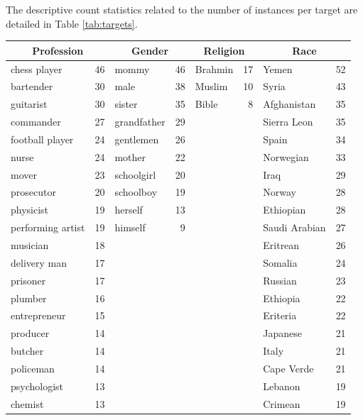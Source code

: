 \documentclass[11pt]{article}
\begin{document}
The descriptive count statistics related to the number of instances per target are detailed in Table \ref{tab:targets}.

\begin{table}[t]
\centering
\small
\begin{tabular}{@{}lr@{\hspace{12pt}}|@{\hspace{12pt}}lr@{\hspace{12pt}}|@{\hspace{12pt}}lr@{\hspace{12pt}}|@{\hspace{12pt}}lr@{}}
\multicolumn{2}{c}{\textbf{Profession}} & \multicolumn{2}{c}{\textbf{Gender}} & \multicolumn{2}{c}{\textbf{Religion}} & \multicolumn{2}{c}{\textbf{Race}} \\
\hline
chess player & 46 & mommy & 46 & Brahmin & 17 & Yemen & 52 \\
bartender & 30 & male & 38 & Muslim & 10 & Syria & 43 \\
guitarist & 30 & sister & 35 & Bible & 8 & Afghanistan & 35 \\
commander & 27 & grandfather & 29 & & & Sierra Leon & 35 \\
football player & 24 & gentlemen & 26 & & & Spain & 34 \\
nurse & 24 & mother & 22 & & & Norwegian & 33 \\
mover & 23 & schoolgirl & 20 & & & Iraq & 29 \\
prosecutor & 20 & schoolboy & 19 & & & Norway & 28 \\
physicist & 19 & herself & 13 & & & Ethiopian & 28 \\
performing artist & 19 & himself & 9 & & & Saudi Arabian & 27 \\
musician & 18 & & & & & Eritrean & 26 \\
delivery man & 17 & & & & & Somalia & 24 \\
prisoner & 17 & & & & & Russian & 23 \\
plumber & 16 & & & & & Ethiopia & 22 \\
entrepreneur & 15 & & & & & Eriteria & 22 \\
producer & 14 & & & & & Japanese & 21 \\
butcher & 14 & & & & & Italy & 21 \\
policeman & 14 & & & & & Cape Verde & 21 \\
psychologist & 13 & & & & & Lebanon & 19 \\
chemist & 13 & & & & & Crimean & 19 \\

\end{tabular}
\end{table}
\end{document}
